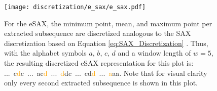 \begin{figure}[htb]
\centering
\texttt{[image: discretization/e\_sax/e\_sax.pdf]}
\caption[Extended Symbolic Aggregate Approximation - Discretization]{For the \ac{eSAX}, the minimum point, mean, and maximum point per extracted subsequence are discretized analogous to the \ac{SAX} discretization based on Equation \ref{eq:SAX_Discretization} \cite{E_SAX}. Thus, with the alphabet symbols $a$, $b$, $c$, $d$  and a window length of $w = 5$, the resulting discretized \ac{eSAX} representation for this plot  is: \mbox{... \textcolor[rgb]{0,0,0.39}{c}\textcolor{orange}{d}\textcolor[rgb]{0,0.39,0}{c} ... \textcolor[rgb]{0,0,0.39}{a}\textcolor[rgb]{0,0.39,0}{c}\textcolor{orange}{d} ... \textcolor{orange}{d}\textcolor[rgb]{0,0.39,0}{d}\textcolor[rgb]{0,0,0.39}{c} ... \textcolor[rgb]{0,0,0.39}{c}\textcolor[rgb]{0,0.39,0}{d}\textcolor{orange}{d} ... \textcolor{orange}{a}\textcolor[rgb]{0,0.39,0}{a}\textcolor[rgb]{0,0,0.39}{a}}. Note that for visual clarity only every second extracted subsequence is shown in this plot.}
\label{fig:E_SAX}
\end{figure}
